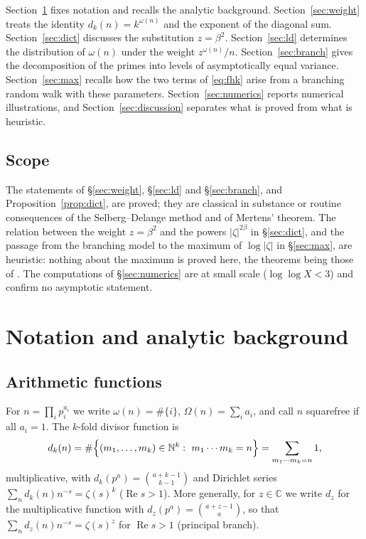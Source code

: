 \documentclass[11pt]{amsart}
\theoremstyle{definition}
\newcommand{\NN}{\mathbb N}
\newcommand{\re}{\operatorname{Re}}
\newcommand{\dk}{d_k}
\newcommand{\loglog}{\log\log}
\begin{document}
Section~\ref{sec:prelim} fixes notation and recalls the analytic background. Section~\ref{sec:weight} treats the
identity $\dk(n)=k^{\omega(n)}$ and the exponent of the diagonal sum. Section~\ref{sec:dict} discusses the
substitution $z=\beta^2$. Section~\ref{sec:ld} determines the distribution of $\omega(n)$ under the weight
$z^{\omega(n)}/n$. Section~\ref{sec:branch} gives the decomposition of the primes into levels of asymptotically
equal variance. Section~\ref{sec:max} recalls how the two terms of \eqref{eq:fhk} arise from a branching random
walk with these parameters. Section~\ref{sec:numerics} reports numerical illustrations, and
Section~\ref{sec:discussion} separates what is proved from what is heuristic.

\subsection{Scope}\label{ssec:scope}
The statements of \S\ref{sec:weight}, \S\ref{sec:ld} and \S\ref{sec:branch}, and Proposition~\ref{prop:dict}, are
proved; they are classical in substance or routine consequences of the Selberg--Delange method and of Mertens'
theorem. The relation between the weight $z=\beta^2$ and the powers $|\zeta|^{2\beta}$ in \S\ref{sec:dict}, and
the passage from the branching model to the maximum of $\log|\zeta|$ in \S\ref{sec:max}, are heuristic: nothing
about the maximum is proved here, the theorems being those of \cite{ABBRS,Najnudel,ABR1,ABR2,HarperFHK}. The
computations of \S\ref{sec:numerics} are at small scale ($\loglog X<3$) and confirm no asymptotic statement.

\section{Notation and analytic background}\label{sec:prelim}

\subsection{Arithmetic functions}
For $n=\prod_i p_i^{a_i}$ we write $\omega(n)=\#\{i\}$, $\Omega(n)=\sum_i a_i$, and call $n$ squarefree if all
$a_i=1$. The $k$-fold divisor function is
\[
\dk(n)=\#\Bigl\{(m_1,\dots,m_k)\in\NN^k:\ m_1\cdots m_k=n\Bigr\}=\sum_{m_1\cdots m_k=n}1,
\]
multiplicative, with $\dk(p^a)=\binom{a+k-1}{k-1}$ and Dirichlet series $\sum_n\dk(n)n^{-s}=\zeta(s)^k$
($\re s>1$). More generally, for $z\in\mathbb C$ we write $d_z$ for the multiplicative function with
$d_z(p^a)=\binom{a+z-1}{a}$, so that $\sum_n d_z(n)n^{-s}=\zeta(s)^z$ for $\re s>1$ (principal branch).
\end{document}
